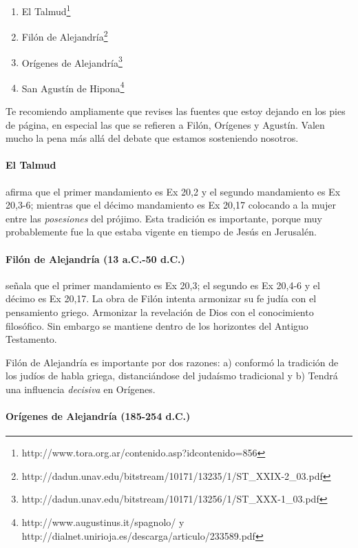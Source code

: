 \documentclass{article}
\begin{document}
\begin{enumerate}
\item El Talmud\footnote{http://www.tora.org.ar/contenido.asp?idcontenido=856}
\item Fil\'on de Alejandr\'{i}a\footnote{http://dadun.unav.edu/bitstream/10171/13235/1/ST\_XXIX-2\_03.pdf}
\item Or\'{i}genes de Alejandr\'{i}a\footnote{http://dadun.unav.edu/bitstream/10171/13256/1/ST\_XXX-1\_03.pdf}
\item San Agust\'{i}n de Hipona\footnote{http://www.augustinus.it/spagnolo/ y http://dialnet.unirioja.es/descarga/articulo/233589.pdf}
\end{enumerate}

\noindent
Te recomiendo ampliamente que revises las fuentes que estoy dejando en los pies de p\'agina, en especial las que se refieren a Fil\'on, Or\'{i}genes y Agust\'{i}n. Valen mucho la pena m\'as all\'a del debate que estamos sosteniendo nosotros.

\paragraph{El Talmud}

afirma que el primer mandamiento es Ex 20,2 y el segundo mandamiento es Ex 20,3-6; mientras que el d\'ecimo mandamiento es Ex 20,17 colocando a la mujer entre las \emph{posesiones} del pr\'ojimo. Esta tradici\'on es importante, porque muy probablemente fue la que estaba vigente en tiempo de Jes\'us en Jerusal\'en.

\paragraph{Fil\'on de Alejandr\'{i}a  (13 a.C.-50 d.C.)}

se\~nala que el primer mandamiento es Ex 20,3; el segundo es Ex 20,4-6 y el d\'ecimo es Ex 20,17. La obra de Fil\'on intenta armonizar su fe jud\'{i}a con el pensamiento griego. Armonizar la revelaci\'on de Dios con el conocimiento filos\'ofico. Sin embargo se mantiene dentro de los horizontes del Antiguo Testamento.

Fil\'on de Alejandr\'{i}a es importante por dos razones: a) conform\'o la tradici\'on de los jud\'{i}os de habla griega, distanci\'andose del juda\'{i}smo tradicional y b) Tendr\'a una influencia \emph{decisiva} en Or\'{i}genes.

\paragraph{Or\'{i}genes de Alejandr\'{i}a (185-254 d.C.)}
\end{document}
